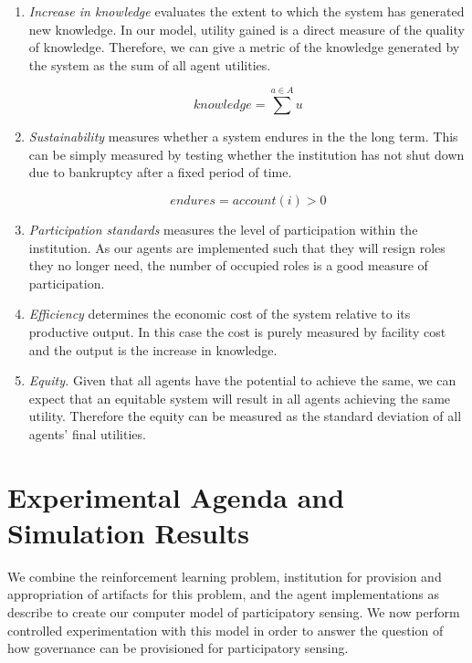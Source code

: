 \begin{enumerate}
\item \emph{Increase in knowledge} evaluates the extent to which the system has
generated new knowledge. In our model, utility gained is a direct measure of the
quality of knowledge. Therefore, we can give a metric of the knowledge generated
by the system as the sum of all agent utilities.

\begin{equation}
\mathit{knowledge} = \sum^{a\in A} u
\end{equation}

\item \emph{Sustainability} measures whether a system endures in the the long term.
This can be simply measured by testing whether the institution has not shut down 
due to bankruptcy after a fixed period of time.

\begin{equation}
\mathit{endures} = \mathit{account}(i) > 0
\end{equation}

\item \emph{Participation standards} measures the level of participation within the 
institution. As our agents are implemented such that they will resign roles they 
no longer need, the number of occupied roles is a good measure of participation.

\item \emph{Efficiency} determines the economic cost of the system relative to its productive output. In this case the cost is purely measured by facility cost and the output is the increase in knowledge.

\item \emph{Equity.} Given that all agents have the potential to achieve the same, we can expect that an equitable system will result in all agents achieving the same utility. Therefore the equity can be measured as the standard deviation of all agents' final utilities. 
\end{enumerate}

\section{Experimental Agenda and Simulation Results}

We combine the reinforcement learning problem, institution for provision and
appropriation of artifacts for this problem, and the agent implementations as
describe to create our computer model of participatory sensing. We now perform
controlled experimentation with this model in order to answer the question of
how governance can be provisioned for participatory sensing.

